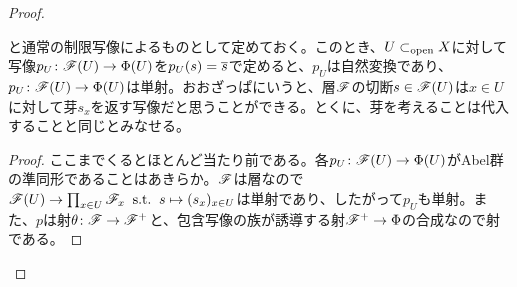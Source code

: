 \begin{proof}
\begin{description}
{\[\]
と通常の制限写像によるものとして定めておく。このとき、$U \subset_{\text{open}} X$に対して写像$p_U \colon \mathscr{F}(U) \to \Phi(U)$を$p_U (s) = \overline{s}$で定めると、$p_U$は自然変換であり、$p_U \colon \mathscr{F}(U) \to \Phi(U)$は単射。おおざっぱにいうと、層$\mathscr{F}$の切断$s \in \mathscr{F}(U)$は$x \in U$に対して芽$s_x$を返す写像だと思うことができる。とくに、芽を考えることは代入することと同じとみなせる。
}
\begin{proof}
  ここまでくるとほとんど当たり前である。各$p_U \colon \mathscr{F}(U) \to \Phi(U)$がAbel群の準同形であることはあきらか。$\mathscr{F}$は層なので$\mathscr{F}(U) \to \prod_{x \in U} \mathscr{F}_x \; \; \text{s.t.} \; \; s \mapsto (s_x)_{x \in U}$は単射であり、したがって$p_U$も単射。また、$p$は射${\theta} \colon \mathscr{F} \to \mathscr{F}^+$と、包含写像の族が誘導する射$\mathscr{F}^+ \to \Phi$の合成なので射である。
\end{proof}


\end{description}
\end{proof}
